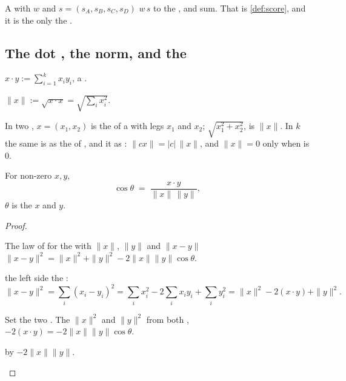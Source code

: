  A  with  $w$ and
  $s=(s_A,s_B,s_C,s_D)$  $w\,s$ to the , and
    sum. That is  \cref{def:score}, and it is
the only     the .

\subsection{The dot , the norm, and the }

\begin{definition}
$x\cdot y := \sum_{i=1}^{k} x_i y_i$, a  .
\end{definition}

\begin{definition}[Norm]
$\|x\| := \sqrt{x\cdot x} = \sqrt{\sum_i x_i^2}$.
\end{definition}

 In two , $x=(x_1,x_2)$ is the 
of a   with legs $x_1$ and $x_2$;   
$\sqrt{x_1^2+x_2^2}$,  is $\|x\|$. In $k$  the same  is
 as the \emph{} of , and it  as  :
$\|cx\|=|c|\,\|x\|$, and $\|x\|=0$ only when   is $0$.

\begin{theorem}
\label{thm:cosangle}
For non-zero $x,y$,
\[
\cos\theta \;=\; \frac{x\cdot y}{\|x\|\,\|y\|},
\]
 $\theta$ is the   $x$ and $y$.
\end{theorem}
\begin{proof}
\begin{steps}
\item The law of  for the  with  $\|x\|$, $\|y\|$
and $\|x-y\|$ 
$\|x-y\|^2 = \|x\|^2+\|y\|^2-2\|x\|\|y\|\cos\theta$.
\item {} the left side  the :
\[
\|x-y\|^2=\sum_i (x_i-y_i)^2=\sum_i x_i^2-2\sum_i x_iy_i+\sum_i y_i^2
=\|x\|^2-2(x\cdot y)+\|y\|^2 .
\]
\item Set the two  . The  $\|x\|^2$ and $\|y\|^2$
 from both ,  $-2(x\cdot y) = -2\|x\|\|y\|\cos\theta$.
\item {} by $-2\|x\|\|y\|$.
\end{steps}
\end{proof}

